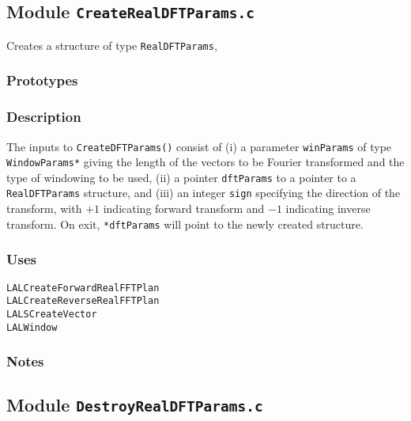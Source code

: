 \newpage
\subsection{Module \texttt{CreateRealDFTParams.c}}
\label{ss:CreateRealDFTParams.c}

Creates a structure of type \verb+RealDFTParams+,

\subsubsection*{Prototypes}
\vspace{0.1in}
%

\subsubsection*{Description}

The inputs to \verb+CreateDFTParams()+ consist of (i) a parameter
\verb+winParams+ of type \verb+WindowParams*+ giving the length of the vectors
to be Fourier  transformed and the type of windowing to be used, (ii) a
pointer \verb+dftParams+ to a pointer to a \verb+RealDFTParams+ structure, and
(iii) an integer \verb+sign+ specifying the direction of the transform, with
$+1$ indicating forward transform and $-1$ indicating inverse transform.  On
exit, \verb+*dftParams+ will point to the newly created structure.

\subsubsection*{Uses}
\begin{verbatim}
LALCreateForwardRealFFTPlan
LALCreateReverseRealFFTPlan
LALSCreateVector
LALWindow 
\end{verbatim}

\subsubsection*{Notes}


\newpage
\subsection{Module \texttt{DestroyRealDFTParams.c}}
\label{ss:DestroyRealDFTParams.c}

